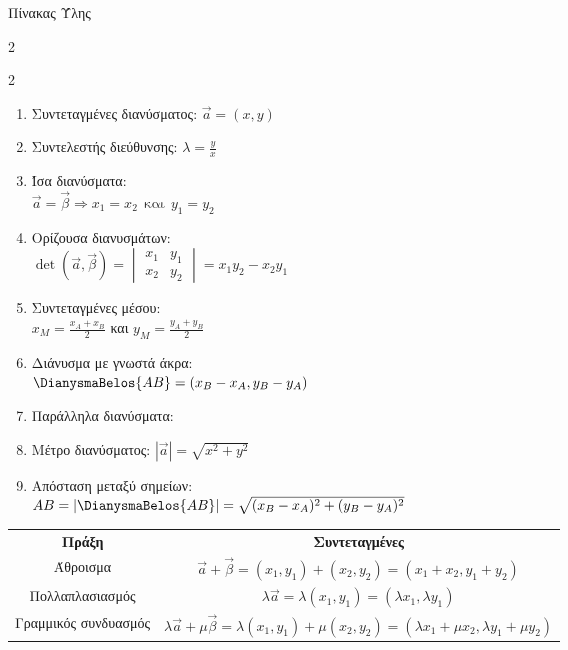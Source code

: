 \documentclass[twoside,nofonts,internet,math,spyros]{frontisthrio}
\begin{document}
\begin{mybox}[mysubtitle]{Πίνακας Ύλης}
\begin{multicols}{2}
\begin{todolist}[itemsep=0mm]
\end{todolist}
\end{multicols}
\begin{multicols}{2}
\begin{enumerate}[itemsep=0mm,leftmargin=5mm]
\item Συντεταγμένες διανύσματος: $\vec{a}=(x,y)$
\item Συντελεστής διεύθυνσης: $\lambda=\frac{y}{x}$
\item Ίσα διανύσματα:\\
$\vec{a}=\vec{\beta}\Rightarrow x_1=x_2\ \ \textrm{και}\ \ y_1=y_2$
\item Ορίζουσα διανυσμάτων:\\$\det(\vec{a},\vec{\beta})=\begin{vmatrix}
x_1 & y_1 \\
x_2 & y_2
\end{vmatrix}=x_1y_2-x_2y_1$
\item Συντεταγμένες μέσου:\\$x_M=\frac{x_A+x_B}{2}$ και $y_M=\frac{y_A+y_B}{2}$
\item Διάνυσμα με γνωστά άκρα:\\
$\DianysmaBelos{AB}=(x_B-x_A,y_B-y_A)$
\item Παράλληλα διανύσματα:
\item Μέτρο διανύσματος: $|\vec{a}|=\sqrt{x^2+y^2}$
\item Απόσταση μεταξύ σημείων:\\
$AB=|\DianysmaBelos{AB}|=\sqrt{(x_B-x_A)^2+(y_B-y_A)^2}$
\end{enumerate}
\end{multicols}
\newpage
{}
\begin{center}
\begin{tabular}{cc}
\hline \rule[-2ex]{0pt}{5.5ex} \textbf{Πράξη} & \textbf{Συντεταγμένες} \\ 
\hhline{==} \rule[-2ex]{0pt}{5.5ex} Άθροισμα & $ \vec{a}+\vec{\beta}=(x_1,y_1)+(x_2,y_2)=(x_1+x_2,y_1+y_2) $ \\ 
\rule[-2ex]{0pt}{5.5ex} Πολλαπλασιασμός & $ \lambda\vec{a}=\lambda(x_1,y_1)=(\lambda x_1,\lambda y_1) $ \\ 
\rule[-2ex]{0pt}{5.5ex} Γραμμικός συνδυασμός & $ \lambda\vec{a}+\mu\vec{\beta}=\lambda(x_1,y_1)+\mu(x_2,y_2)=(\lambda x_1+\mu x_2,\lambda y_1+\mu y_2) $ \\ 
\hline 
\end{tabular}
\end{center} 
\end{mybox}
\end{document}

